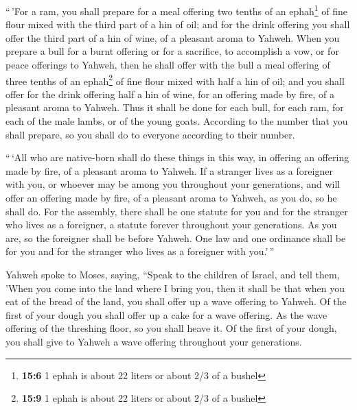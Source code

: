  ``\,'For a ram, you shall prepare for a meal offering two
tenths of an ephah\footnote{\textbf{15:6} 1 ephah is about 22 liters or
  about 2/3 of a bushel} of fine flour mixed with the third part of a
hin of oil;  and for the drink offering you shall offer
the third part of a hin of wine, of a pleasant aroma to Yahweh.
 When you prepare a bull for a burnt offering or for a
sacrifice, to accomplish a vow, or for peace offerings to Yahweh,
 then he shall offer with the bull a meal offering of
three tenths of an ephah\footnote{\textbf{15:9} 1 ephah is about 22
  liters or about 2/3 of a bushel} of fine flour mixed with half a hin
of oil;  and you shall offer for the drink offering half
a hin of wine, for an offering made by fire, of a pleasant aroma to
Yahweh.  Thus it shall be done for each bull, for each
ram, for each of the male lambs, or of the young goats. 
According to the number that you shall prepare, so you shall do to
everyone according to their number.

 ``\,`All who are native-born shall do these things in
this way, in offering an offering made by fire, of a pleasant aroma to
Yahweh.  If a stranger lives as a foreigner with you, or
whoever may be among you throughout your generations, and will offer an
offering made by fire, of a pleasant aroma to Yahweh, as you do, so he
shall do.  For the assembly, there shall be one statute
for you and for the stranger who lives as a foreigner, a statute forever
throughout your generations. As you are, so the foreigner shall be
before Yahweh.  One law and one ordinance shall be for
you and for the stranger who lives as a foreigner with you.'\,''

 Yahweh spoke to Moses, saying,  ``Speak
to the children of Israel, and tell them, 'When you come into the land
where I bring you,  then it shall be that when you eat of
the bread of the land, you shall offer up a wave offering to Yahweh.
 Of the first of your dough you shall offer up a cake for
a wave offering. As the wave offering of the threshing floor, so you
shall heave it.  Of the first of your dough, you shall
give to Yahweh a wave offering throughout your generations.

